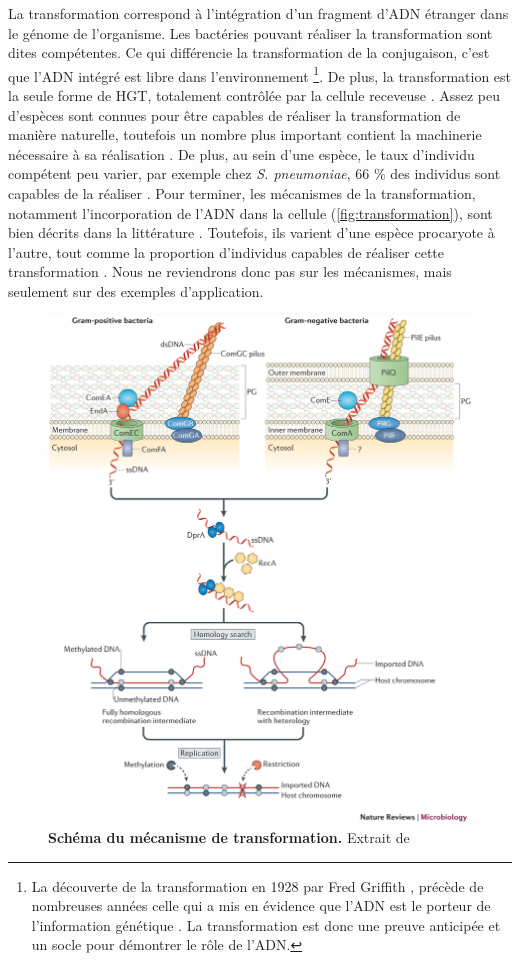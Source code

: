 La transformation correspond à l'intégration d'un fragment d'ADN étranger dans le génome de l'organisme. Les bactéries pouvant réaliser la transformation sont dites compétentes. Ce qui  différencie la transformation de la conjugaison, c'est que l'ADN intégré est libre dans l'environnement
\footnote{La découverte de la transformation en 1928 par Fred Griffith \cite{griffith_significance_1928}, précède de nombreuses années celle qui a mis en évidence que l'ADN est le porteur de l'information génétique \cite{avery_studies_1944}. La transformation est donc une preuve anticipée et un socle pour démontrer le rôle de l'ADN.}. De plus, la transformation est la seule forme de HGT, totalement contrôlée par la cellule receveuse \cite{huang_activation_2021}. Assez peu d'espèces sont connues pour être capables de réaliser la transformation de manière naturelle, toutefois un nombre plus important contient  la machinerie nécessaire à sa réalisation \cite{johnston_bacterial_2014}. De plus, au sein d'une espèce, le taux d'individu compétent peu varier, par exemple chez \textit{S. pneumoniae}, 66 \% des individus sont capables de la réaliser \cite{evans_significant_2013}.
Pour terminer, les mécanismes de la transformation, notamment l’incorporation de l’ADN dans la cellule (\autoref{fig:transformation}), sont bien décrits dans la littérature \cite{johnston_bacterial_2014,dubnau_mechanisms_2019}. Toutefois, ils varient d’une espèce procaryote à l’autre, tout comme la proportion d’individus capables de réaliser cette transformation \cite{stewart_biology_1986}. Nous ne reviendrons donc pas sur les mécanismes, mais seulement sur des exemples d'application.

\begin{figure}[htbp]
    \centering
    \includegraphics[width=0.625\linewidth]{images/transformation.png}
    \caption[Schéma du mécanisme de transformation]{\textbf{Schéma du mécanisme de transformation.} Extrait de \cite{johnston_bacterial_2014}}
    \label{fig:transformation}
\end{figure}

